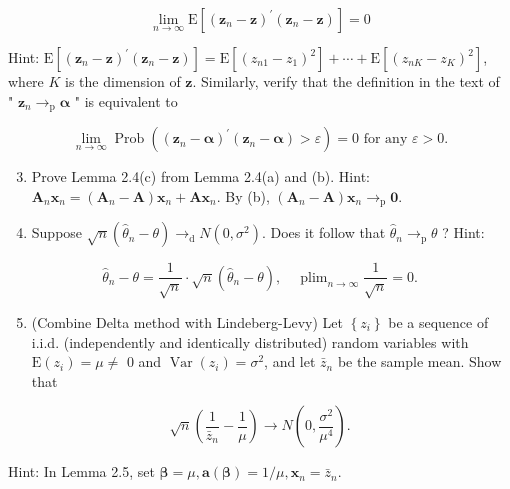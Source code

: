 \documentclass[10pt]{article}
\begin{document}
$$
\lim _{n \rightarrow \infty} \mathrm{E}\left[\left(\mathbf{z}_{n}-\mathbf{z}\right)^{\prime}\left(\mathbf{z}_{n}-\mathbf{z}\right)\right]=0
$$

Hint: $\mathrm{E}\left[\left(\mathbf{z}_{n}-\mathbf{z}\right)^{\prime}\left(\mathbf{z}_{n}-\mathbf{z}\right)\right]=\mathrm{E}\left[\left(z_{n 1}-z_{1}\right)^{2}\right]+\cdots+\mathrm{E}\left[\left(z_{n K}-z_{K}\right)^{2}\right]$, where $K$ is the dimension of $\mathbf{z}$. Similarly, verify that the definition in the text of\\
" $\mathbf{z}_{n} \rightarrow_{\mathrm{p}} \boldsymbol{\alpha}$ " is equivalent to

$$
\lim _{n \rightarrow \infty} \operatorname{Prob}\left(\left(\mathbf{z}_{n}-\boldsymbol{\alpha}\right)^{\prime}\left(\mathbf{z}_{n}-\boldsymbol{\alpha}\right)>\varepsilon\right)=0 \text { for any } \varepsilon>0 .
$$

\begin{enumerate}
  \setcounter{enumi}{2}
  \item Prove Lemma 2.4(c) from Lemma 2.4(a) and (b). Hint: $\mathbf{A}_{n} \mathbf{x}_{n}=\left(\mathbf{A}_{n}-\mathbf{A}\right) \mathbf{x}_{n}+ \mathbf{A} \mathbf{x}_{n}$. By (b), $\left(\mathbf{A}_{n}-\mathbf{A}\right) \mathbf{x}_{n} \rightarrow_{\mathrm{p}} \mathbf{0}$.
  \item Suppose $\sqrt{n}\left(\hat{\theta}_{n}-\theta\right) \rightarrow_{\mathrm{d}} N\left(0, \sigma^{2}\right)$. Does it follow that $\hat{\theta}_{n} \rightarrow_{\mathrm{p}} \theta$ ? Hint:
\end{enumerate}

$$
\hat{\theta}_{n}-\theta=\frac{1}{\sqrt{n}} \cdot \sqrt{n}\left(\hat{\theta}_{n}-\theta\right), \quad \operatorname{plim}_{n \rightarrow \infty} \frac{1}{\sqrt{n}}=0 .
$$

\begin{enumerate}
  \setcounter{enumi}{4}
  \item (Combine Delta method with Lindeberg-Levy) Let $\left\{z_{i}\right\}$ be a sequence of i.i.d. (independently and identically distributed) random variables with $\mathrm{E}\left(z_{i}\right)=\mu \neq$ 0 and $\operatorname{Var}\left(z_{i}\right)=\sigma^{2}$, and let $\bar{z}_{n}$ be the sample mean. Show that
\end{enumerate}

$$
\sqrt{n}\left(\frac{1}{\bar{z}_{n}}-\frac{1}{\mu}\right) \rightarrow N\left(0, \frac{\sigma^{2}}{\mu^{4}}\right) .
$$

Hint: In Lemma 2.5, set $\boldsymbol{\beta}=\mu, \mathbf{a}(\boldsymbol{\beta})=1 / \mu, \mathbf{x}_{n}=\bar{z}_{n}$.
\end{document}
